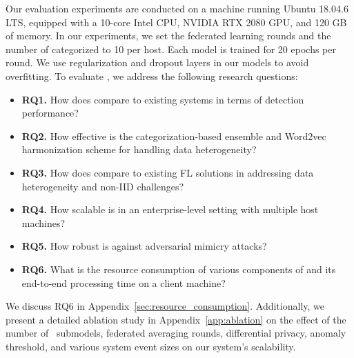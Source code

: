 
Our evaluation experiments are conducted on a machine running Ubuntu 18.04.6 LTS, equipped with a 10-core Intel CPU, NVIDIA RTX 2080 GPU, and 120 GB of memory. In our experiments, we set the federated learning rounds and the number of categorized \gnnshort to 10 per host. Each model is trained for 20 epochs per round. We use regularization and dropout layers in our models to avoid overfitting. To evaluate \Sys, we address the following research questions:


\begin{itemize}[leftmargin=*,itemsep=0.1em, parsep=0em, topsep=0em]
  \item \textbf{RQ1.} How does \Sys compare to existing systems in terms of detection performance?
  \item \textbf{RQ2.} How effective is the categorization-based \gnnshort ensemble and Word2vec harmonization scheme for handling data heterogeneity?
  \item \textbf{RQ3.} How does \Sys compare to existing FL solutions in addressing data heterogeneity and non-IID challenges?
  \item \textbf{RQ4.} How scalable is \Sys in an enterprise-level setting with multiple host machines?
  \item \textbf{RQ5.} How robust is \Sys against adversarial mimicry attacks?
  \item \textbf{RQ6.} What is the resource consumption of various components of \Sys and its end-to-end processing time on a client machine?
  \end{itemize}  

We discuss RQ6 in Appendix~\ref{sec:resource_consumption}. Additionally, we present a detailed ablation study in Appendix~\ref{app:ablation} on the effect of the number of \gnnshort\ submodels, federated averaging rounds, differential privacy, anomaly threshold, and various system event sizes on our system’s scalability.

